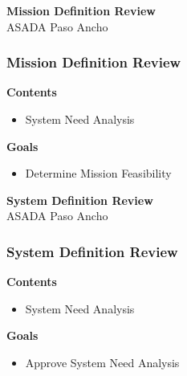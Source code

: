 \documentclass[aspectratio=169]{beamer}
\begin{document}
\begin{frame}
    \begin{center}
        {\LARGE \textbf{Mission Definition Review}} \\
        \vspace{0.5cm}
        {ASADA Paso Ancho} \\
        \vspace{0.25cm}
    \end{center}
\end{frame}

\begin{frame}
    \frametitle{Mission Definition Review}

    {\textbf{Contents}}
    \begin{itemize}
        \item System Need Analysis
    \end{itemize}
    \vspace{0.25cm}
    {\textbf{Goals}}
    \begin{itemize}
        \item Determine Mission Feasibility
    \end{itemize}
\end{frame}

\begin{frame}
    \begin{center}
        {\LARGE \textbf{System Definition Review}} \\
        \vspace{0.5cm}
        {ASADA Paso Ancho} \\
        \vspace{0.25cm}
    \end{center}
\end{frame}

\begin{frame}
    \frametitle{System Definition Review}

    {\textbf{Contents}}
    \begin{itemize}
        \item System Need Analysis
    \end{itemize}
    \vspace{0.25cm}
    {\textbf{Goals}}
    \begin{itemize}
        \item Approve System Need Analysis
    \end{itemize}
\end{frame}
\end{document}
